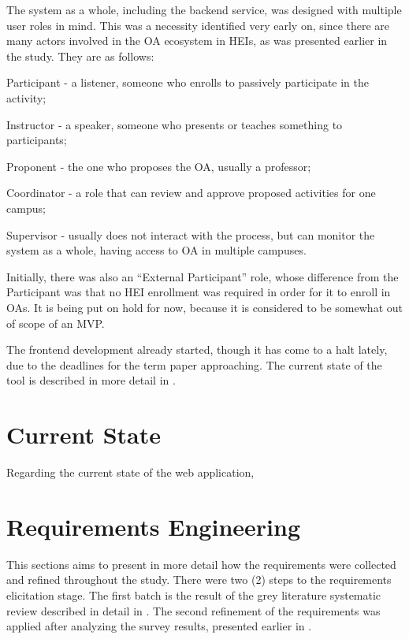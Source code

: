 The system as a whole, including the backend service, was designed with multiple user roles in mind. This was a necessity identified very early on, since there are many actors involved in the \ac{OA} ecosystem in \acp{HEI}, as was presented earlier in the study. They are as follows:
\begin{inparaenum}[(1)]
  \item Participant - a listener, someone who enrolls to passively participate in the activity;
  \item Instructor - a speaker, someone who presents or teaches something to participants;
  \item Proponent - the one who proposes the \ac{OA}, usually a professor;
  \item Coordinator - a role that can review and approve proposed activities for one campus;
  \item Supervisor - usually does not interact with the process, but can monitor the system as a whole, having access to \ac{OA} in multiple campuses.
\end{inparaenum}
Initially, there was also an ``External Participant'' role, whose difference from the Participant was that no \ac{HEI} enrollment was required in order for it to enroll in \acp{OA}. It is being put on hold for now, because it is considered to be somewhat out of scope of an \ac{MVP}.

The frontend development already started, though it has come to a halt lately, due to the deadlines for the term paper approaching. The current state of the tool is described in more detail in .

\section{Current State}\label{ext:current-state}

Regarding the current state of the web application,

\section{Requirements Engineering}\label{ext:requirement-engineering}

This sections aims to present in more detail how the requirements were collected and refined throughout the study. There were two (2) steps to the requirements elicitation stage. The first batch is the result of the grey literature systematic review described in detail in . The second refinement of the requirements was applied after analyzing the survey results, presented earlier in .

